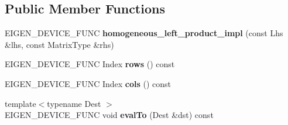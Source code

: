 \subsection*{Public Member Functions}
\begin{DoxyCompactItemize}
\item 
\mbox{\label{struct_eigen_1_1internal_1_1homogeneous__left__product__impl_3_01_homogeneous_3_01_matrix_type_042480d8c61b8193bc4c7039abeeef67a_a95c89c2d79d85648adb771c18c62c64e}} 
E\+I\+G\+E\+N\+\_\+\+D\+E\+V\+I\+C\+E\+\_\+\+F\+U\+NC {\bfseries homogeneous\+\_\+left\+\_\+product\+\_\+impl} (const Lhs \&lhs, const Matrix\+Type \&rhs)
\item 
\mbox{\label{struct_eigen_1_1internal_1_1homogeneous__left__product__impl_3_01_homogeneous_3_01_matrix_type_042480d8c61b8193bc4c7039abeeef67a_a82500824ec1679fe92e83aebe57ae5c3}} 
E\+I\+G\+E\+N\+\_\+\+D\+E\+V\+I\+C\+E\+\_\+\+F\+U\+NC Index {\bfseries rows} () const
\item 
\mbox{\label{struct_eigen_1_1internal_1_1homogeneous__left__product__impl_3_01_homogeneous_3_01_matrix_type_042480d8c61b8193bc4c7039abeeef67a_a2d4c98637bdb643e19e04d248d951c2f}} 
E\+I\+G\+E\+N\+\_\+\+D\+E\+V\+I\+C\+E\+\_\+\+F\+U\+NC Index {\bfseries cols} () const
\item 
\mbox{\label{struct_eigen_1_1internal_1_1homogeneous__left__product__impl_3_01_homogeneous_3_01_matrix_type_042480d8c61b8193bc4c7039abeeef67a_adbfc9287d4a0983a7b6ef20164827bd6}} 
{\footnotesize template$<$typename Dest $>$ }\\E\+I\+G\+E\+N\+\_\+\+D\+E\+V\+I\+C\+E\+\_\+\+F\+U\+NC void {\bfseries eval\+To} (Dest \&dst) const
\end{DoxyCompactItemize}
